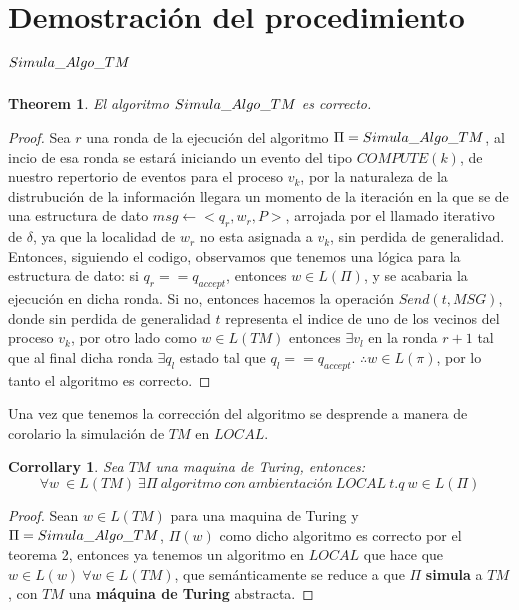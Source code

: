 \documentclass[10pt]{report}
\newtheorem{corrollary}{Corrollary}
\newtheorem{theorem}{Theorem}
\begin{document}
{    \section{Demostración del procedimiento $Simula\char95Algo\char95TM$}\label{sec:demostración-del-procedimiento}
    \begin{theorem}
        El algoritmo $Simula\char95Algo\char95TM$ es correcto.
    \end{theorem}
    \begin{proof}
        Sea $r$ una ronda de la ejecución del algoritmo $\Pi=Simula\char95Algo\char95TM$,
        al incio de esa ronda se estará iniciando un evento del tipo $COMPUTE(k)$, de nuestro repertorio de eventos para el proceso
        $v_{k}$, por la naturaleza de la distrubución de la información llegara un momento
        de la iteración en la que  se de una estructura de dato $msg\gets <q_{r},w_{r},P>$, arrojada por el llamado iterativo de
        $\delta$, ya que la localidad de $w_{r}$ no esta asignada a $v_{k}$, sin perdida de generalidad.
        Entonces, siguiendo el codigo, observamos que tenemos una lógica para la estructura de dato:
        si $q_{r}==q_{accept}$, entonces $w\in L(\Pi)$, y se acabaria la ejecución en dicha ronda.
        Si no, entonces hacemos la operación $Send(t,MSG)$, donde sin perdida de generalidad $t$ representa el indice de uno de los vecinos
        del proceso $v_{k}$, por otro lado como $w\in L(TM)$ entonces $\exists v_{l}$ en la ronda $r+1$
        tal que al final dicha ronda $\exists q_{l}$ estado tal que $q_{l} == q_{accept}$.\newline
        $\therefore w\in L(\pi)$, por lo tanto el algoritmo es correcto.

    \end{proof}
    Una vez que tenemos la corrección del algoritmo se desprende a manera de corolario la
    simulación de $TM$ en $LOCAL$.
    \begin{corrollary}
        Sea $TM$ una maquina de Turing, entonces:
        \begin{equation}
            \forall w \  \in L(TM) \ \exists \Pi \ algoritmo \ con\ ambientación \ LOCAL\ t.q \ w \in L(\Pi)
        \end{equation}
    \end{corrollary}

    \begin{proof}
        Sean $w\in L(TM)$ para una maquina de Turing y  $\Pi =Simula\char95Algo\char95TM$, $\Pi(w)$ como dicho algoritmo es correcto por el teorema 2,
        entonces ya tenemos un algoritmo  en $LOCAL$ que hace  que $w\in L(w) \ \forall w\in L(TM)$,
        que semánticamente se reduce a que $\Pi$ \textbf{simula} a $TM$, con $TM$ una \textbf{máquina de Turing} abstracta.
    \end{proof}

}
\end{document}
